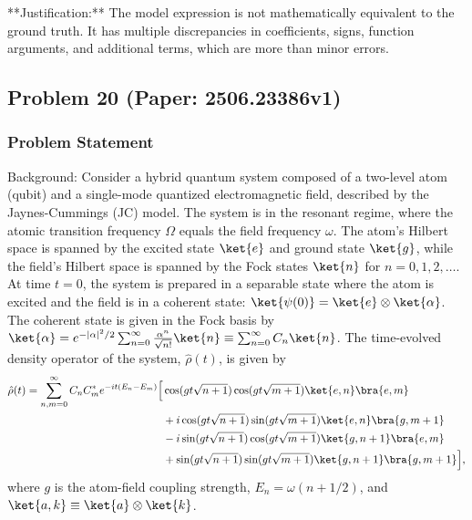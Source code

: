 \documentclass[10pt]{article}
\begin{document}
**Justification:** The model expression is not mathematically equivalent to the ground truth. It has multiple discrepancies in coefficients, signs, function arguments, and additional terms, which are more than minor errors.

\newpage
\subsection*{Problem 20 (Paper: 2506.23386v1)}
\subsubsection*{Problem Statement}
Background:
Consider a hybrid quantum system composed of a two-level atom (qubit) and a single-mode quantized electromagnetic field, described by the Jaynes-Cummings (JC) model. The system is in the resonant regime, where the atomic transition frequency $\Omega$ equals the field frequency $\omega$. The atom's Hilbert space is spanned by the excited state $\ket{e}$ and ground state $\ket{g}$, while the field's Hilbert space is spanned by the Fock states $\ket{n}$ for $n=0, 1, 2, \dots$. At time $t=0$, the system is prepared in a separable state where the atom is excited and the field is in a coherent state: $\ket{\psi(0)} = \ket{e} \otimes \ket{\alpha}$. The coherent state is given in the Fock basis by $\ket{\alpha} = e^{-\left|\alpha\right|^2/2} \sum_{n=0}^{\infty} \frac{\alpha^n}{\sqrt{n!}} \ket{n} \equiv \sum_{n=0}^{\infty} C_n \ket{n}$. The time-evolved density operator of the system, $\hat{\rho}(t)$, is given by
\begin{align*}
\hat{\rho}(t) = \sum_{n,m=0}^{\infty} C_n C_m^* e^{-i t (E_n - E_m)} \Big[ & \cos(gt\sqrt{n+1}) \cos(gt\sqrt{m+1}) \ket{e,n}\bra{e,m} \\
& + i \cos(gt\sqrt{n+1}) \sin(gt\sqrt{m+1}) \ket{e,n}\bra{g,m+1} \\
& - i \sin(gt\sqrt{n+1}) \cos(gt\sqrt{m+1}) \ket{g,n+1}\bra{e,m} \\
& + \sin(gt\sqrt{n+1}) \sin(gt\sqrt{m+1}) \ket{g,n+1}\bra{g,m+1} \Big],
\end{align*}
where $g$ is the atom-field coupling strength, $E_n = \omega(n+1/2)$, and $\ket{a,k} \equiv \ket{a} \otimes \ket{k}$.
\end{document}

